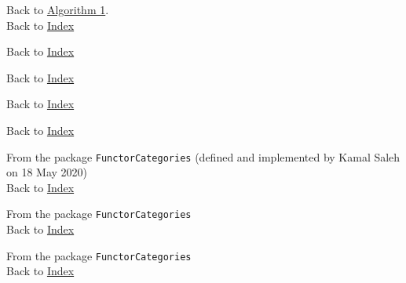 
\lstlistoflistings\label{lol}

\renewcommand{\lstlistingname}{Procedure}



Back to \hyperref[algo:ConvertToMapOfFinSets]{Algorithm 1}.\\
Back to \hyperref[lol]{Index}


Back to \hyperref[lol]{Index}
		

Back to \hyperref[lol]{Index}
		

Back to \hyperref[lol]{Index}
		

Back to \hyperref[lol]{Index}
		

From the package \texttt{FunctorCategories} (defined and implemented by Kamal Saleh on 18 May 2020) \\
Back to \hyperref[lol]{Index}


From the package \texttt{FunctorCategories}\\
Back to \hyperref[lol]{Index}
		

From the package \texttt{FunctorCategories}\\
Back to \hyperref[lol]{Index}

		
